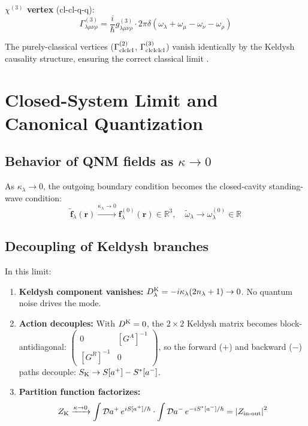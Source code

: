 \documentclass[12pt]{article}
\newcommand{\cl}{{\rm cl}}
\newcommand{\Keldysh}{{\rm K}}
\newcommand{\tf}{\tilde{\mathbf{f}}}
\newcommand{\tomega}{\tilde{\omega}}
\begin{document}
\textbf{$\chi^{(3)}$ vertex} (cl-cl-q-q):
\begin{equation}
  \Gamma^{(3)}_{\lambda\mu\nu\rho} =
  \frac{i}{\hbar}g^{(3)}_{\lambda\mu\nu\rho}\cdot
  2\pi\delta(\omega_\lambda+\omega_\mu-\omega_\nu-\omega_\rho)
\end{equation}

The purely-classical vertices ($\Gamma^{(2)}_{\cl\cl\cl}$,
$\Gamma^{(3)}_{\cl\cl\cl\cl}$) vanish identically by the Keldysh
causality structure, ensuring the correct classical limit
\cite{Sieberer2016}.

\section{Closed-System Limit and Canonical Quantization}
\label{sec:closedlimit}

\subsection{Behavior of QNM fields as $\kappa\to 0$}

As $\kappa_\lambda\to 0$, the outgoing boundary condition becomes the
closed-cavity standing-wave condition:
\begin{equation}
  \tf_\lambda(\mathbf{r})
  \xrightarrow{\kappa_\lambda\to 0}
  \mathbf{f}^{(0)}_\lambda(\mathbf{r})\in\mathbb{R}^3,\quad
  \tomega_\lambda\to\omega_\lambda^{(0)}\in\mathbb{R}
  \label{eq:real_limit}
\end{equation}

\subsection{Decoupling of Keldysh branches}

In this limit:
\begin{enumerate}
  \item \textbf{Keldysh component vanishes:}
    $D_\lambda^\Keldysh = -i\kappa_\lambda(2n_\lambda+1)\to 0$.
    No quantum noise drives the mode.

  \item \textbf{Action decouples:}
    With $D^\Keldysh=0$, the $2\times 2$ Keldysh matrix becomes
    block-antidiagonal:
    $\begin{pmatrix}0 & [G^A]^{-1}\\ {}[G^R]^{-1} & 0\end{pmatrix}$,
    so the forward ($+$) and backward ($-$) paths decouple:
    $S_\Keldysh\to S[a^+]-S^*[a^-]$.

  \item \textbf{Partition function factorizes:}
    \begin{equation}
      Z_\Keldysh\xrightarrow{\kappa\to 0}
      \int\mathcal{D}a^+\,e^{iS[a^+]/\hbar}\cdot
      \int\mathcal{D}a^-\,e^{-iS^*[a^-]/\hbar}
      = \left|Z_{\rm in\text{-}out}\right|^2
      \label{eq:factorize}
    \end{equation}
\end{enumerate}
\end{document}
